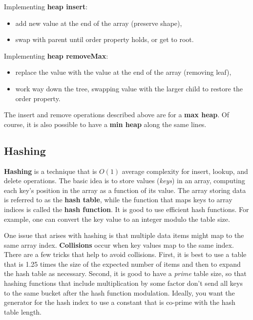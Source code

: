 Implementing \textbf{heap insert}:
\begin{itemize}
	\item add new value at the end of the array (preserve shape),
	\item swap with parent until order property holds, or get to root.
\end{itemize}

Implementing \textbf{heap removeMax}:
\begin{itemize}
	\item replace the value with the value at the end of the array (removing leaf), 
	\item work way down the tree, swapping value with the larger child to restore the order property.
\end{itemize}

The insert and remove operations described above are for a \textbf{max heap}. Of course, it is also possible to have a \textbf{min heap} along the same lines. 

\subsection{Hashing}

\textbf{Hashing} is a technique that is $O(1)$ average complexity for insert, lookup, and delete operations. The basic idea is to store values (\textit{keys}) in an array, computing each key's position in the array as a function of its value. The array storing data is referred to as the \textbf{hash table}, while the function that maps keys to array indices is called the \textbf{hash function}. It is good to use efficient hash functions. For example, one can convert the key value to an integer modulo the table size. 

One issue that arises with hashing is that multiple data items might map to the same array index. \textbf{Collisions} occur when key values map to the same index. There are a few tricks that help to avoid collisions. First, it is best to use a table that is 1.25 times the size of the expected number of items and then to expand the hash table as necessary. Second, it is good to have a \textit{prime} table size, so that hashing functions that include multiplication by some factor don't send all keys to the same bucket after the hash function modulation. Ideally, you want the generator for the hash index to use a constant that is co-prime with the hash table length. 

